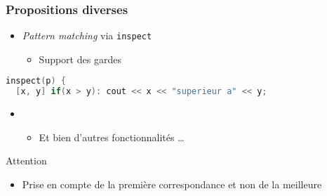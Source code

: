 \documentclass[C++.tex]{subfiles}
\begin{document}
\begin{frame}[fragile]
	\frametitle{Propositions diverses}
	\begin{itemize}
		\item \textit{Pattern matching} via \lstinline|inspect|
		\begin{itemize}
			\item Support des gardes
		\end{itemize}
	\end{itemize}

	\begin{lstlisting}[language=C++]
inspect(p) {
  [x, y] if(x > y): cout << x << "superieur a" << y;\end{lstlisting}

	\begin{itemize}
		\item [] \begin{itemize}
			\item Et bien d'autres fonctionnalités \ldots
		\end{itemize}
	\end{itemize}

	\begin{alertblock}{Attention}
		\begin{itemize}
			\item Prise en compte de la première correspondance et non de la meilleure
		\end{itemize}

	\end{alertblock}
\end{frame}
\end{document}
